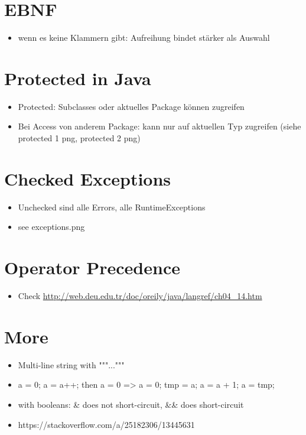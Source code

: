 \documentclass[UTF8]{article}
\begin{document}


\section{EBNF}

\begin{itemize}
    \item wenn es keine Klammern gibt: Aufreihung bindet stärker als Auswahl
\end{itemize}

\section{Protected in Java}

\begin{itemize}
    \item Protected: Subclasses oder aktuelles Package können zugreifen
    \item Bei Access von anderem Package: kann nur auf aktuellen Typ zugreifen (siehe protected 1 png, protected 2 png)
\end{itemize}


\section{Checked Exceptions}

\begin{itemize}
    \item Unchecked sind alle Errors, alle RuntimeExceptions
    \item see exceptions.png
\end{itemize}

\section{Operator Precedence}

\begin{itemize}
    \item Check \url{http://web.deu.edu.tr/doc/oreily/java/langref/ch04_14.htm}
\end{itemize}

\section{More}

\begin{itemize}
    \item Multi-line string with """..."""
    \item a = 0; a = a++; then a = 0 => a = 0; tmp = a; a = a + 1; a = tmp;
    \item with booleans: \& does not short-circuit, \&\& does short-circuit
    \item https://stackoverflow.com/a/25182306/13445631
\end{itemize}
\end{document}
